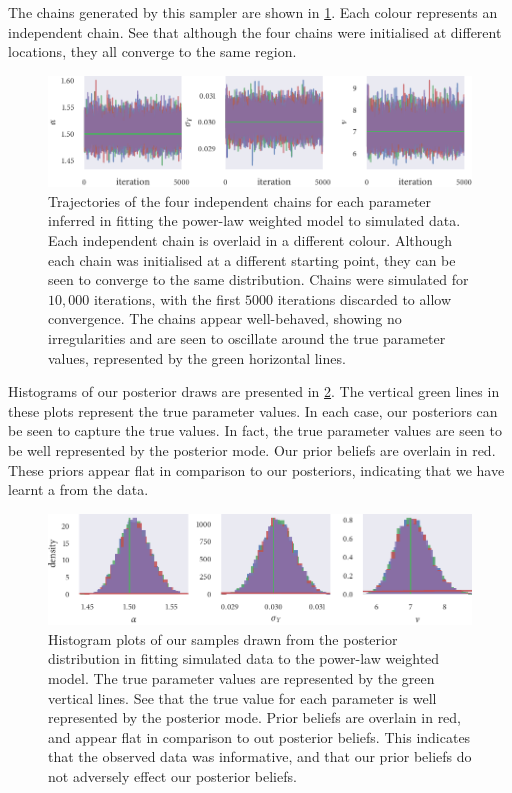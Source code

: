The chains generated by this sampler are shown in \cref{fig:power_trace}. Each
colour represents an independent chain. See that although the four chains were
initialised at different locations, they all converge to the same region.

\begin{figure}[tbp]
  \includegraphics{power_trace.pdf}
  \caption{Trajectories of the four independent chains for each parameter
    inferred in fitting the power-law weighted model to simulated data. Each
    independent chain is overlaid in a different colour. Although each chain
    was initialised at a different starting point, they can be seen to
    converge to the same distribution. Chains were simulated for $10,000$
    iterations, with the first $5000$ iterations discarded to allow
    convergence. The chains appear well-behaved, showing no irregularities
    and are seen to oscillate around the true parameter values, represented
    by the green horizontal lines.}
  \label{fig:power_trace}
\end{figure}

Histograms of our posterior draws are presented in \cref{fig:power_hist}. The
vertical green lines in these plots represent the true parameter values. In
each case, our posteriors can be seen to capture the true values. In fact, the
true parameter values are seen to be well represented by the posterior mode.
Our prior beliefs are overlain in red. These priors appear flat in comparison
to our posteriors, indicating that we have learnt a from the data.

\begin{figure}[tbp]
  \includegraphics{power_hist.pdf}
  \caption{Histogram plots of our samples drawn from the posterior distribution
    in fitting simulated data to the power-law weighted model. The true
    parameter values are represented by the green vertical lines. See that
    the true value for each parameter is well represented by the posterior
    mode. Prior beliefs are overlain in red, and appear flat in comparison to
    out posterior beliefs. This indicates that the observed data was
    informative, and that our prior beliefs do not adversely effect our
    posterior beliefs.}
  \label{fig:power_hist}
\end{figure}

